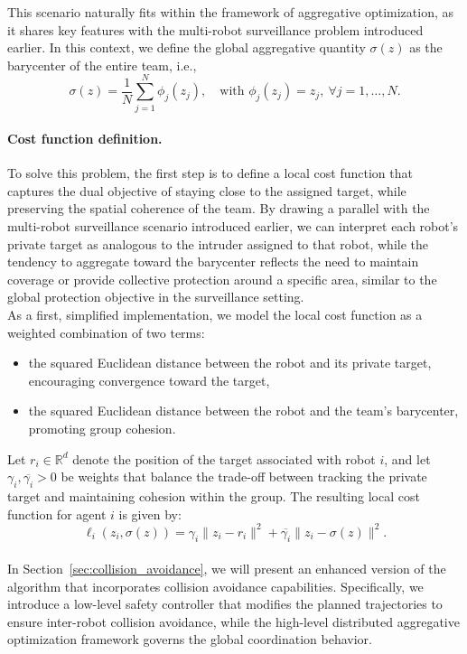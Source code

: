 \noindent This scenario naturally fits within the framework of aggregative optimization, as it shares key features with the multi-robot surveillance problem introduced earlier. In this context, we define the global aggregative quantity \(\sigma(z)\) as the barycenter of the entire team, i.e.,
\[
\sigma(z) = \frac{1}{N} \sum_{j=1}^N \phi_j(z_j), \quad \text{with } \phi_j(z_j) = z_j, \ \forall j = 1, \dots, N.
\]

\paragraph{Cost function definition.} To solve this problem, the first step is to define a local cost function that captures the dual objective of staying close to the assigned target, while preserving the spatial coherence of the team.
By drawing a parallel with the multi-robot surveillance scenario introduced earlier, we can interpret each robot's private target as analogous to the intruder assigned to that robot, while the tendency to aggregate toward the barycenter reflects the need to maintain coverage or provide collective protection around a specific area, similar to the global protection objective in the surveillance setting. \\
As a first, simplified implementation, we model the local cost function as a weighted combination of two terms:
\begin{itemize}
    \item the squared Euclidean distance between the robot and its private target, encouraging convergence toward the target,
    \item the squared Euclidean distance between the robot and the team's barycenter, promoting group cohesion.
\end{itemize}

\noindent Let \(r_i \in \mathbb{R}^d\) denote the position of the target associated with robot \(i\), and let \(\gamma_i, \overline{\gamma_i} > 0\) be weights that balance the trade-off between tracking the private target and maintaining cohesion within the group. The resulting local cost function for agent \(i\) is given by:
\[
\ell_i(z_i, \sigma(z)) = \gamma_i \| z_i - r_i \|^2 + \overline{\gamma_i} \| z_i - \sigma(z) \|^2.
\] \\
In Section~\ref{sec:collision_avoidance}, we will present an enhanced version of the algorithm that incorporates collision avoidance capabilities. Specifically, we introduce a low-level safety controller that modifies the planned trajectories to ensure inter-robot collision avoidance, while the high-level distributed aggregative optimization framework governs the global coordination behavior.

